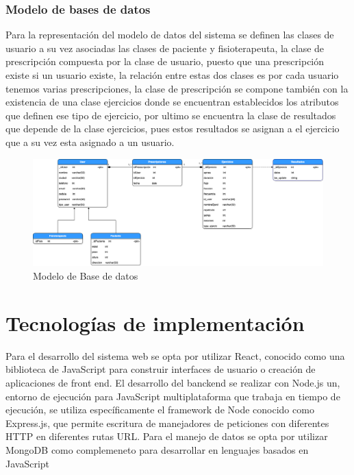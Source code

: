 \documentclass[12pt]{article}
\begin{document}

\newpage

\subsubsection{Modelo de bases de datos}

Para la representación del modelo de datos del sistema se definen las clases de usuario a su vez asociadas las clases de paciente y fisioterapeuta, la clase de prescripción compuesta por la clase de usuario, puesto que una prescripción existe si un usuario existe, la relación entre estas dos clases es por cada usuario tenemos varias prescripciones, la clase de prescripción se compone también con la existencia de una clase ejercicios donde se encuentran establecidos los atributos que definen ese tipo de ejercicio, por ultimo se encuentra la clase de resultados que depende de la clase ejercicios, pues estos resultados se asignan a el ejercicio que a su vez esta asignado a un usuario.


\begin{figure}[ht]
\centering
\includegraphics[scale=0.36]{imag/C4-DB.png}
\caption{Modelo de Base de datos}
\label{6}
\end{figure}
\FloatBarrier









\section{Tecnologías de implementación}

Para el desarrollo del sistema web se opta por utilizar React, conocido como una biblioteca de JavaScript para construir interfaces de usuario o creación de aplicaciones de front end. El desarrollo del banckend se realizar con Node.js un, entorno de ejecución para JavaScript multiplataforma que trabaja en tiempo de ejecución, se utiliza específicamente el framework de Node conocido como Express.js, que permite escritura de manejadores de peticiones con diferentes HTTP en diferentes rutas URL. Para el manejo de datos se opta por utilizar MongoDB como complemeneto para desarrollar en lenguajes basados en JavaScript
\end{document}
